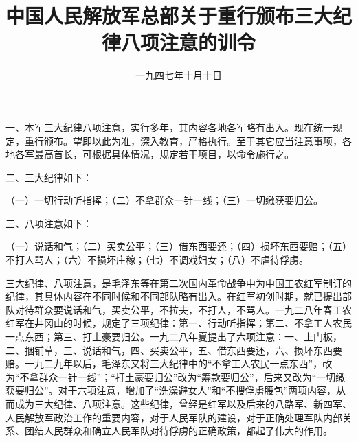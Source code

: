 
\title{中国人民解放军总部关于重行颁布三大纪律八项注意的训令}
\date{一九四七年十月十日}
\maketitle


一、本军三大纪律八项注意，实行多年，其内容各地各军略有出入。现在统一规定，重行颁布。望即以此为准，深入教育，严格执行。至于其它应当注意事项，各地各军最高首长，可根据具体情况，规定若干项目，以命令施行之。

二、三大纪律如下：

（一）一切行动听指挥；（二）不拿群众一针一线；（三）一切缴获要归公。

三、八项注意如下：

（一）说话和气；（二）买卖公平；（三）借东西要还；（四）损坏东西要赔；（五）不打人骂人；（六）不损坏庄稼；（七）不调戏妇女；（八）不虐待俘虏。


\begin{maonote}
三大纪律、八项注意，是毛泽东等在第二次国内革命战争中为中国工农红军制订的纪律，其具体内容在不同时候和不同部队略有出入。在红军初创时期，就已提出部队对待群众要说话和气，买卖公平，不拉夫，不打人，不骂人。一九二八年春工农红军在井冈山的时候，规定了三项纪律：第一、行动听指挥；第二、不拿工人农民一点东西；第三、打土豪要归公。一九二八年夏提出了六项注意：一、上门板，二、捆铺草，三、说话和气，四、买卖公平，五、借东西要还，六、损坏东西要赔。一九二九年以后，毛泽东又将三大纪律中的“不拿工人农民一点东西”，改为“不拿群众一针一线”；“打土豪要归公”改为“筹款要归公”，后来又改为“一切缴获要归公”。对于六项注意，增加了“洗澡避女人”和“不搜俘虏腰包”两项内容，从而成为三大纪律、八项注意。这些纪律，曾经是红军以及后来的八路军、新四军、人民解放军政治工作的重要内容，对于人民军队的建设，对于正确处理军队内部关系、团结人民群众和确立人民军队对待俘虏的正确政策，都起了伟大的作用。
\end{maonote}
